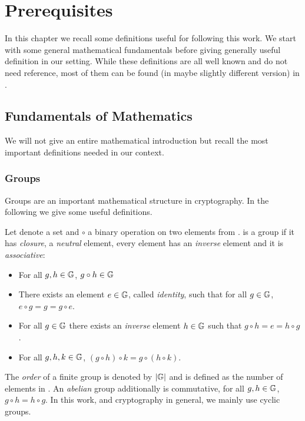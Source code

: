 \chapter{Prerequisites}\label{ch:background}
In this chapter we recall some definitions useful for following this work.
We start with some general mathematical fundamentals before giving generally useful definition in our setting.
While these definitions are all well known and do not need reference, most of them can be found (in maybe slightly different version) in \cite{katz2008introduction}.

\section{Fundamentals of Mathematics}
We will not give an entire mathematical introduction but recall the most important definitions needed in our context.

\subsection{Groups}
Groups are an important mathematical structure in cryptography.
In the following we give some useful definitions.

\begin{definition}[Groups]\label{def:groups}
Let \GG denote a set and $\circ$ a binary operation on two elements from \GG.
\GG is a group if it has \emph{closure}, a \emph{neutral} element, every element has an \emph{inverse} element and it is \emph{associative}:
\begin{itemize}
	\item For all $g,h\in\mathbb{G}$, $g\circ h \in\mathbb{G}$
	\item There exists an element $e\in\mathbb{G}$, called \emph{identity}, such that for all $g\in\mathbb{G}$, $e\circ g=g=g\circ e$.
	\item For all $g\in\mathbb{G}$ there exists an \emph{inverse} element $h\in\mathbb{G}$ such that $g\circ h=e=h\circ g$.
	\item For all $g,h,k\in\mathbb{G}$, $(g\circ h)\circ k=g\circ (h \circ k)$.
\end{itemize}
\eod
\end{definition}

\noindent
The \emph{order} of a finite group \GG is denoted by $|\mathbb{G}|$ and is defined as the number of elements in \GG.
An \emph{abelian} group additionally is commutative, \ie for all $g,h\in\mathbb{G}$, $g\circ h=h\circ g$.
In this work, and cryptography in general, we mainly use cyclic groups.


